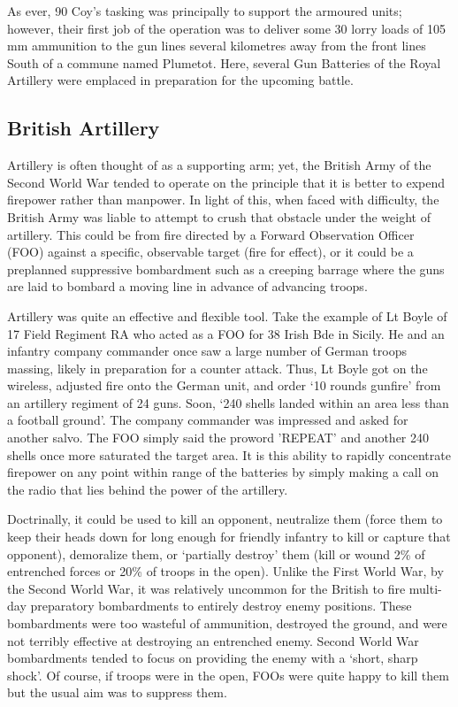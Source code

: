 \documentclass[noraggedright]{turabian-researchpaper}
\begin{document}
As ever, 90 Coy's tasking was principally to support the armoured units; however,
their first job of the operation was to deliver some 30 lorry loads of 105 mm
ammunition to the gun lines several kilometres away from the front lines South
of a commune named Plumetot.  Here, several Gun Batteries of the Royal Artillery
were emplaced in preparation for the upcoming battle. 

	\subsection{British Artillery} %

Artillery is often thought of as a supporting arm; yet, the British Army of the
Second World War tended to operate on the principle that it is better to expend 
firepower rather than manpower.  In light of this, when faced with difficulty,
the British Army was liable to attempt to crush that obstacle under the weight
of artillery.  This could be from fire directed by a Forward Observation 
Officer (FOO) against a specific, observable target (fire for effect), or it 
could be a preplanned suppressive bombardment such as a creeping barrage where 
the guns are laid to bombard a moving line in advance of advancing troops.

Artillery was quite an effective and flexible tool.  Take the example of 
Lt Boyle of 17 Field Regiment RA who acted as a FOO for 38 Irish Bde in 
Sicily.  He and an infantry company commander once saw a large number of German 
troops massing, likely in preparation for a counter attack.  Thus, Lt Boyle 
got on the wireless, adjusted fire onto the German unit, and order `10 
rounds gunfire' from an artillery regiment of 24 guns.  Soon, `240 shells
landed within an area less than a football ground'.\autocite[133]{gunfire}
The company commander was impressed and asked for another salvo.  The FOO
simply said the proword 'REPEAT' and another 240 shells once more
saturated the target area.\autocite[133]{gunfire}  It is this ability to 
rapidly concentrate firepower on any point within range of the batteries
by simply making a call on the radio that lies behind the power of the
artillery.

Doctrinally, it could be used to kill an opponent,
neutralize them (force them to keep their heads down for long enough for 
friendly infantry to kill or capture that opponent), demoralize them, or 
`partially destroy' them (kill or wound 2\% of entrenched forces or 20\% of 
troops in the open).\autocite[133]{gunfire}  Unlike the First World War, by 
the Second World War, it was relatively uncommon for the British to fire
multi-day preparatory bombardments to entirely destroy enemy positions.  
These bombardments were too wasteful of ammunition, destroyed the ground, and
were not terribly effective at destroying an entrenched enemy.  
Second World War bombardments tended to focus on providing the enemy with a
`short, sharp shock'.  Of course, if troops were in the open, FOOs were quite 
happy to kill them but the usual aim was to suppress them.  
\end{document}
